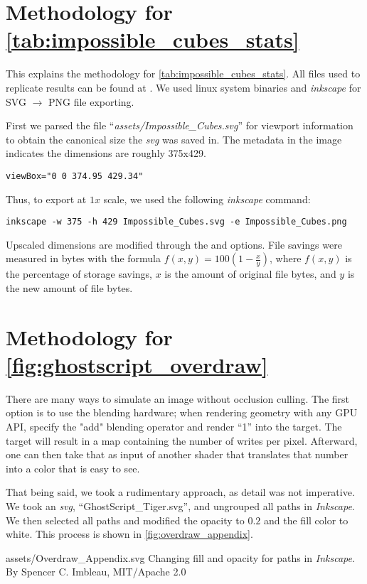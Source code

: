 \appendix
{}\label{sec:appendix}

\section{Methodology for \cref{tab:impossible_cubes_stats}}
\label{appendix:svg_vs_png}
This explains the methodology for \cref{tab:impossible_cubes_stats}.
All files used to replicate results can be found at \thesisrepo. We used linux system binaries and \textit{inkscape} for SVG $\rightarrow$ PNG file exporting.\medskip

First we parsed the file ``\textit{assets/Impossible\_Cubes.svg}'' for viewport information to obtain the canonical size the \textit{svg} was saved in. The metadata in the image indicates the dimensions are roughly 375x429.
\medskip

\begin{verbatim}viewBox="0 0 374.95 429.34"\end{verbatim}
\medskip

Thus, to export at $1x$ scale, we used the following \textit{inkscape} command:

\begin{verbatim}inkscape -w 375 -h 429 Impossible_Cubes.svg -e Impossible_Cubes.png\end{verbatim}
\medskip

Upscaled dimensions are modified through the  and  options. File savings were measured in bytes with the formula $f(x,y)=100(1-\frac{x}{y})$, where $f(x,y)$ is the percentage of storage savings, $x$ is the amount of original file bytes, and $y$ is the new amount of file bytes.

\section{Methodology for \cref{fig:ghostscript_overdraw}}
\label{appendix:overdraw}
There are many ways to simulate an image without occlusion culling. The first option is to use the blending hardware; when rendering geometry with any GPU API, specify the "add" blending operator and render ``1'' into the target. The target will result in a map containing the number of writes per pixel. Afterward, one can then take that as input of another shader that translates that number into a color that is easy to see.\medskip

That being said, we took a rudimentary approach, as detail was not imperative. We took an \textit{svg}, ``GhostScript\_Tiger.svg'', and ungrouped all paths in \textit{Inkscape}. We then selected all paths and modified the opacity to \(0.2\) and the fill color to white. This process is shown in \cref{fig:overdraw_appendix}.\medskip

\widesvg
{assets/Overdraw_Appendix.svg}
{Changing fill and opacity for paths in \textit{Inkscape}.\label{fig:overdraw_appendix}}
{By Spencer C. Imbleau, MIT/Apache 2.0}



